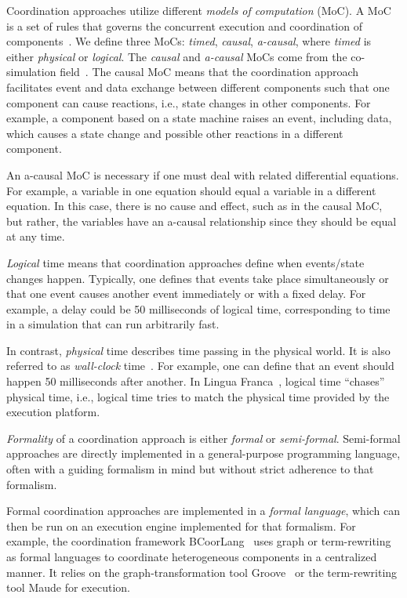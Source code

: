 \documentclass[runningheads]{llncs}
\newcommand{\quotes}[1]{``#1''}
\begin{document}
Coordination approaches utilize different \textit{models of computation} (MoC).
A MoC is a set of rules that governs the concurrent execution and coordination of components~\cite{ptolemaeusSystemDesignModeling2014}.
We define three MoCs: \textit{timed}, \textit{causal}, \textit{a-causal}, where \textit{timed} is either \textit{physical} or \textit{logical}.
The \textit{causal} and \textit{a-causal} MoCs come from the co-simulation field~\cite{gomesCoSimulationSurvey2019}.
The causal MoC means that the coordination approach facilitates event and data exchange between different components such that one component can cause reactions, i.e., state changes in other components.
For example, a component based on a state machine raises an event, including data, which causes a state change and possible other reactions in a different component.

An a-causal MoC is necessary if one must deal with related differential equations.
For example, a variable in one equation should equal a variable in a different equation.
In this case, there is no cause and effect, such as in the causal MoC, but rather, the variables have an a-causal relationship since they should be equal at any time.

\textit{Logical} time means that coordination approaches define when events/state changes happen.
Typically, one defines that events take place simultaneously or that one event causes another event immediately or with a fixed delay.
For example, a delay could be 50 milliseconds of logical time, corresponding to time in a simulation that can run arbitrarily fast.

In contrast, \textit{physical} time describes time passing in the physical world.
It is also referred to as \textit{wall-clock} time~\cite{gomesCoSimulationSurvey2019}.
For example, one can define that an event should happen 50 milliseconds after another.
In Lingua Franca~\cite{lohstrohReactorsDeterministicModel2020}, logical time \quotes{chases} physical time, i.e., logical time tries to match the physical time provided by the execution platform.

\textit{Formality} of a coordination approach is either \textit{formal} or \textit{semi-formal}.
Semi-formal approaches are directly implemented in a general-purpose programming language, often with a guiding formalism in mind but without strict adherence to that formalism.

Formal coordination approaches are implemented in a \textit{formal language}, which can then be run on an execution engine implemented for that formalism.
For example, the coordination framework BCoorLang~\cite{krauterBehavioralConsistencyMultimodeling2023} uses graph or term-rewriting as formal languages to coordinate heterogeneous components in a centralized manner.
It relies on the graph-transformation tool Groove~\cite{rensinkGROOVESimulatorTool2004} or the term-rewriting tool Maude for execution.
\end{document}
